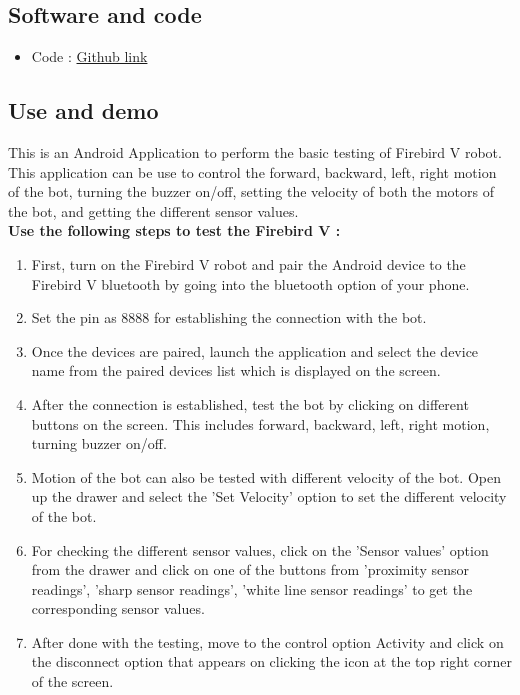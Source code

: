 \documentclass[a4paper,12pt,oneside]{book}
\newcommand{\head}[1]{\textnormal{\textbf{#1}}}
\begin{document}
    \subsection*{Software and code}
        \begin{itemize}
        \item Code : 
        \href{https://github.com/eYSIP-2016/Firebird_V_Testing_Android_App/tree/Wi-bird-App}{Github link} 
        \end{itemize}
	
	\subsection*{Use and demo}
    This is an Android Application to perform the basic testing of Firebird V robot. This application can be use to control the forward, backward, left, right motion of the bot, turning the buzzer on/off, setting the velocity of both the motors of the bot, and getting the different sensor values.\\
    
    \head{Use the following steps to test the Firebird V : }
    \begin{enumerate}
    \item First, turn on the Firebird V robot and pair the Android device to the Firebird V bluetooth by going into the bluetooth option of your phone.  
    \item Set the pin as 8888 for establishing the connection with the bot.
    \item Once the devices are paired, launch the application and select the device name from the paired devices list which is displayed on the screen.
    \item After the connection is established, test the bot by clicking on different buttons on the screen. This includes forward, backward, left, right motion, turning buzzer on/off.
    \item Motion of the bot can also be tested with different velocity of the bot. Open up the drawer and select the 'Set Velocity' option to set the different velocity of the bot.
    \item For checking the different sensor values, click on the 'Sensor values' option from the drawer and click on one of the buttons from 'proximity sensor readings', 'sharp sensor readings', 'white line sensor readings' to get the corresponding sensor values.
    \item After done with the testing, move to the control option Activity and click on the disconnect option that appears on clicking the icon at the top right corner of the screen.
    
    \end{enumerate}
\end{document}
